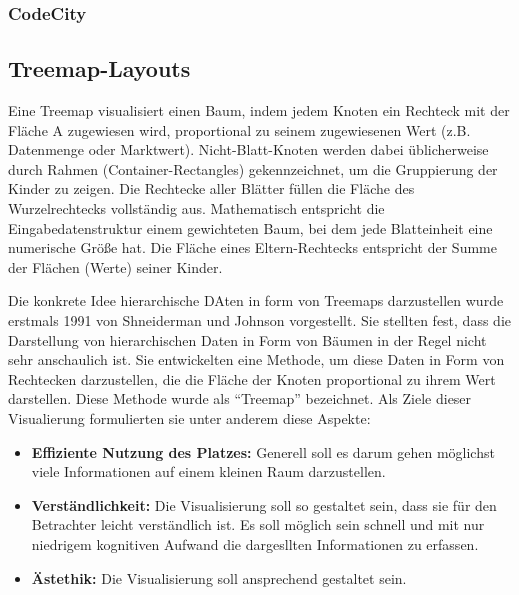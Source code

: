 \subsubsection{CodeCity} \label{sec:CodeCity}


\subsection{Treemap-Layouts} \label{sec:Treemap}

Eine Treemap visualisiert einen Baum, indem jedem Knoten ein Rechteck mit der Fläche A zugewiesen wird, proportional zu seinem zugewiesenen Wert (z.B. Datenmenge oder Marktwert). Nicht-Blatt-Knoten werden dabei üblicherweise durch Rahmen (Container-Rectangles) gekennzeichnet, um die Gruppierung der Kinder zu zeigen. \cite{bruls2000squarified} Die Rechtecke aller Blätter füllen die Fläche des Wurzelrechtecks vollständig aus. Mathematisch entspricht die Eingabedatenstruktur einem gewichteten Baum, bei dem jede Blatteinheit eine numerische Größe hat. Die Fläche eines Eltern-Rechtecks entspricht der Summe der Flächen (Werte) seiner Kinder.

Die konkrete Idee hierarchische DAten in form von Treemaps darzustellen wurde erstmals 1991 von Shneiderman und Johnson \cite{johnson1991tree} vorgestellt. Sie stellten fest, dass die Darstellung von hierarchischen Daten in Form von Bäumen in der Regel nicht sehr anschaulich ist. Sie entwickelten eine Methode, um diese Daten in Form von Rechtecken darzustellen, die die Fläche der Knoten proportional zu ihrem Wert darstellen. Diese Methode wurde als \enquote{Treemap} bezeichnet. Als Ziele dieser Visualierung formulierten sie unter anderem diese Aspekte:
\begin{itemize}
    \item \textbf{Effiziente Nutzung des Platzes:} Generell soll es darum gehen möglichst viele Informationen auf einem kleinen Raum darzustellen.
    \item \textbf{Verständlichkeit:} Die Visualisierung soll so gestaltet sein, dass sie für den Betrachter leicht verständlich ist. Es soll möglich sein schnell und mit nur niedrigem kognitiven Aufwand die dargesllten Informationen zu erfassen.
    \item \textbf{Ästethik:} Die Visualisierung soll ansprechend gestaltet sein.
\end{itemize}

